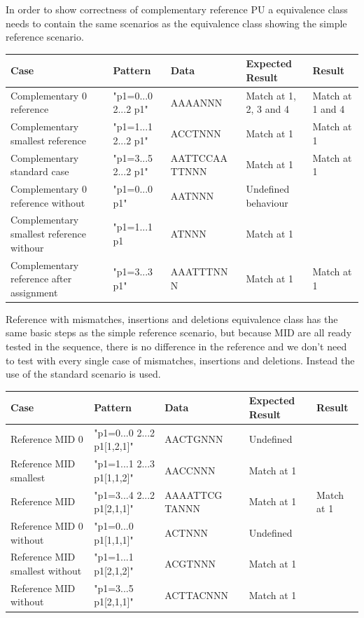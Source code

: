 \documentclass[12pt]{article}
\newcommand{\textapprox}{\raisebox{0.5ex}{\texttildelow}}
\newcommand{\pu}{PU }
\begin{document}
In order to show correctness of complementary reference \pu a equivalence class needs to contain the same scenarios
as the equivalence class showing the simple reference scenario.
\begin{table}[H]
\begin{tabular}{p{4cm}|p{3cm}|p{2.5cm}|p{2.5cm}|p{2.5cm}}
Case 			& Pattern & Data & Expected Result & Result \\ \hline
Complementary 0 reference & "p1=0...0 2...2 \textapprox p1" & AAAANNN & Match at 1, 2, 3 and 4 & Match at 1 and 4\\ \hline
Complementary smallest reference & "p1=1...1 2...2 \textapprox p1" & ACCTNNN & Match at 1 & Match at 1\\ \hline
Complementary standard case & "p1=3...5 2...2 \textapprox p1" & AATTCCAA TTNNN & Match at 1 & Match at 1\\ \hline
Complementary 0 reference without & "p1=0...0 \textapprox p1" & AATNNN & Undefined behaviour & \\ \hline
Complementary smallest reference withour & "p1=1...1 \textapprox p1 & ATNNN & Match at 1 & \\ \hline 
Complementary reference after assignment & "p1=3...3 \textapprox p1" & AAATTTNN N & Match at 1 & Match at 1\\ \hline
\end{tabular}
\end{table}

Reference with mismatches, insertions and deletions equivalence class has the same basic steps as the simple reference
scenario, but because MID are all ready tested in the sequence, there is no difference in the reference and we don't
need to test with every single case of mismatches, insertions and deletions. Instead the use of the standard scenario is 
used.
\begin{table}[H]
\begin{tabular}{p{4cm}|p{3cm}|p{2.5cm}|p{2.5cm}|p{2.5cm}}
Case 			& Pattern & Data & Expected Result & Result \\ \hline
Reference MID 0 & "p1=0...0 2...2 p1[1,2,1]" & AACTGNNN & Undefined & \\ \hline
Reference MID smallest & "p1=1...1 2...3 p1[1,1,2]" & AACCNNN & Match at 1 & \\ \hline
Reference MID & "p1=3...4 2...2 p1[2,1,1]" & AAAATTCG TANNN & Match at 1 & Match at 1\\ \hline
Reference MID 0 without & "p1=0...0 p1[1,1,1]" & ACTNNN & Undefined & \\ \hline
Reference MID smallest without & "p1=1...1 p1[2,1,2]" & ACGTNNN & Match at 1 & \\ \hline
Reference MID without & "p1=3...5 p1[2,1,1]" & ACTTACNNN & Match at 1 & \\ \hline
\end{tabular}
\end{table}
\end{document}

